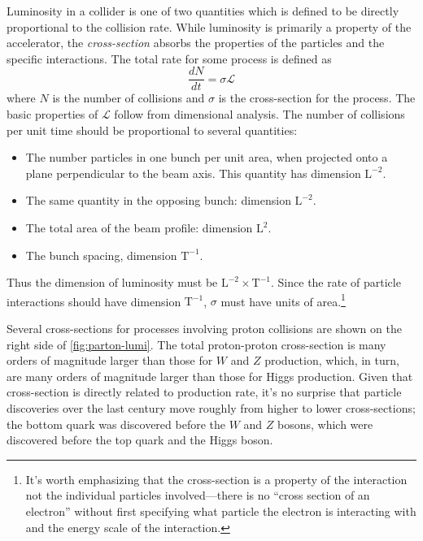 Luminosity in a collider is one of two quantities which is defined to be directly proportional to the collision rate.
While luminosity is primarily a property of the accelerator, the \emph{cross-section} absorbs the properties of the particles and the specific interactions.
The total rate for some process is defined as
\begin{equation}
  \frac{d N}{d t} = \sigma \mathcal{L}
  \label{eq:lumi-cross-section}
\end{equation}
where $N$ is the number of collisions and $\sigma$ is the cross-section for the process.
The basic properties of $\mathcal{L}$ follow from dimensional analysis.
The number of collisions per unit time should be proportional to several quantities:
\begin{itemize}
\item The number particles in one bunch per unit area, when projected onto a plane perpendicular to the beam axis. This quantity has dimension $\mathrm{L}^{-2}$.
\item The same quantity in the opposing bunch: dimension $\mathrm{L}^{-2}$.
\item The total area of the beam profile: dimension $\mathrm{L}^2$.
\item The bunch spacing, dimension $\mathrm{T}^{-1}$.
\end{itemize}
Thus the dimension of luminosity must be $\mathrm{L}^{-2} \times \mathrm{T}^{-1}$.
Since the rate of particle interactions should have dimension $\mathrm{T}^{-1}$, $\sigma$ must have units of area.\footnote{%
It's worth emphasizing that
the cross-section is a property of the interaction not the individual particles involved---there is no ``cross section of an electron'' without first specifying what particle the electron is interacting with and the energy scale of the interaction.}

Several cross-sections for processes involving proton collisions are shown on the right side of \cref{fig:parton-lumi}.
The total proton-proton cross-section is many orders of magnitude larger than those for $W$ and $Z$ production, which, in turn, are many orders of magnitude larger than those for Higgs production.
Given that cross-section is directly related to production rate, it's no surprise that particle discoveries over the last century move roughly from higher to lower cross-sections; the bottom quark was discovered before the $W$ and $Z$ bosons, which were discovered before the top quark and the Higgs boson.


